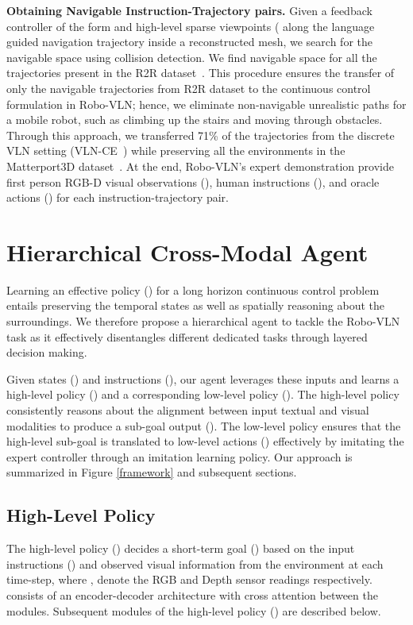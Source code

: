 \documentclass[letter, 10pt, conference]{ieeeconf}
\begin{document}
\textbf{Obtaining Navigable Instruction-Trajectory pairs.}
Given a feedback controller of the form  and high-level sparse viewpoints ( along the language guided navigation trajectory inside a reconstructed mesh, we search for the navigable space  using collision detection.
We find navigable space for all the trajectories present in the R2R dataset~\cite{mattersim}.
This procedure ensures the transfer of only the navigable trajectories from R2R dataset to the continuous control formulation in Robo-VLN; hence, we eliminate non-navigable unrealistic paths for a mobile robot, such as climbing up the stairs and moving through obstacles. 
Through this approach, we transferred 71\% of the trajectories from the discrete VLN setting (VLN-CE~\cite{krantz2020navgraph}) while preserving all the environments in the Matterport3D dataset~\cite{Matterport3D}. At the end, Robo-VLN's expert demonstration provide first person RGB-D visual observations (), human instructions (), and oracle actions () for each instruction-trajectory pair.

\section{Hierarchical Cross-Modal Agent}
Learning an effective policy () for a long horizon continuous control problem entails preserving the temporal states as well as spatially reasoning about the surroundings. 
We therefore propose a hierarchical agent to tackle the Robo-VLN task as it effectively disentangles different dedicated tasks through layered decision making. 
\begin{comment}
Our approach is to decouple reasoning and imitation and learn a high-level policy () and a corresponding low-level policy (). 
\end{comment}
Given states () and instructions (), our agent leverages these inputs and learns a high-level policy () and a corresponding low-level policy (). 
The high-level policy consistently reasons about the alignment between input textual and visual modalities to produce a sub-goal output (). The low-level policy ensures that the high-level sub-goal is translated to low-level actions () effectively by imitating the expert controller through an imitation learning policy. Our approach is summarized in Figure \ref{framework} and subsequent sections.

\subsection{High-Level Policy}
The high-level policy () decides a short-term goal () based on the input instructions () and observed visual information  from the environment at each time-step, where ,  denote the RGB and Depth sensor readings respectively.  consists of an encoder-decoder architecture with cross attention between the modules. Subsequent modules of the high-level policy () are described below.
\end{document}
